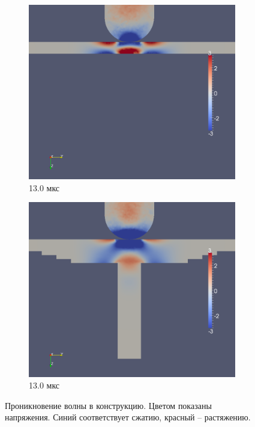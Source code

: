 \begin{figure}[htp]
\begin{subfigure}[b]{0.5\textwidth}
\centering
\includegraphics[width=\textwidth]{png/pkm-experiment/wing-only/wave/syy-0011.png}
\caption{13.0 мкс}
\end{subfigure}
\begin{subfigure}[b]{0.5\textwidth}
\centering
\includegraphics[width=\textwidth]{png/pkm-experiment/wing-stringer/wave/syy-0011.png}
\caption{13.0 мкс}
\end{subfigure}
\caption{Проникновение волны в конструкцию. Цветом показаны напряжения. Синий соответствует сжатию, красный -- растяжению.}
\label{pic:pkm_experiment_stress_end}
\end{figure}

